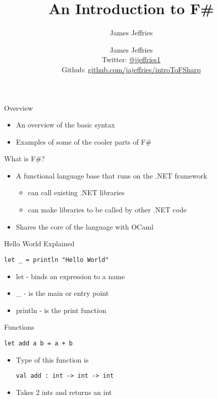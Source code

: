 \documentclass[landscape]{slides}
\author{James Jeffries}
\author{\parbox{.5\textwidth}{\centering
  James Jeffries \\
  \small Twitter: \href{http://www.twitter.com/jjeffries1}{@jjeffries1} \\[3pt]
  Github: \href{https://github.com/jajeffries/introToFSharp}{github.com/jajeffries/introToFSharp}}}
\title{An Introduction to F\#}
\begin{document}
\begin{slide}
\maketitle
\end{slide}

\begin{slide}{Overview}
\begin{itemize}
\item An overview of the basic syntax
\item Examples of some of the cooler parts of F\#
\end{itemize}
\end{slide}

\begin{slide}{What is F\#?}
\begin{itemize}
\item A functional language base that runs on the .NET framework
\begin{itemize}
\item can call existing .NET libraries
\item can make libraries to be called by other .NET code
\end{itemize}
\item Shares the core of the language with OCaml
\end{itemize}
\end{slide}

\begin{slide}{Hello World Explained}
\begin{verbatim}
let _ = println "Hello World"
\end{verbatim}
\begin{itemize}
\item let - binds an expression to a name
\item \_ - is the main or entry point
\item println - is the print function
\end{itemize}
\end{slide}

\begin{slide}{Functions}
\begin{verbatim}
let add a b = a + b
\end{verbatim}
\begin{itemize}
\item Type of this function is
\begin{verbatim}
val add : int -> int -> int
\end{verbatim}
\item Takes 2 ints and returns an int
\end{itemize}
\end{slide}
\end{document}
